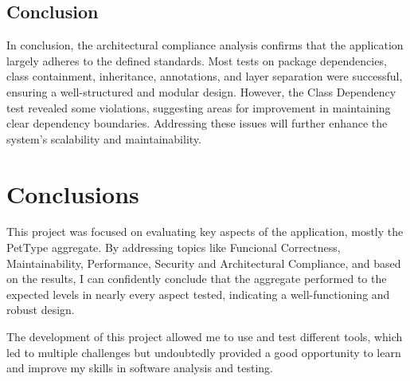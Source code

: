 \documentclass[a4paper,11pt,openright,BCOR=15mm]{scrbook}
\begin{document}
	\section{Conclusion}
	In conclusion, the architectural compliance analysis confirms that the application largely adheres to the defined standards. Most tests on package dependencies, class containment, inheritance, annotations, and layer separation were successful, ensuring a well-structured and modular design. However, the Class Dependency test revealed some violations, suggesting areas for improvement in maintaining clear dependency boundaries. Addressing these issues will further enhance the system’s scalability and maintainability.

	
	


	\chapter{Conclusions }
	This project was focused on evaluating key aspects of the application, mostly the PetType aggregate. By addressing topics like Funcional Correctness, Maintainability, Performance, Security and Architectural Compliance, and based on the results, I can confidently conclude that the aggregate performed to the expected levels in nearly every aspect tested, indicating a well-functioning and robust design. 
	
	
	The development of this project allowed me to use and test different tools, which led to multiple challenges but undoubtedly provided a good opportunity to learn and improve my skills in software analysis and testing.




 





	
	
	\renewcommand\bibname{References}
	
	\label{references}
	
\end{document}
